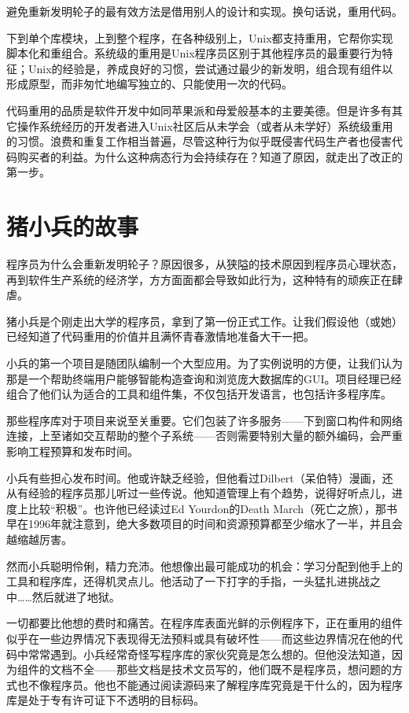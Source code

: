 \documentclass[12pt,oneside]{book}
\begin{document}
避免重新发明轮子的最有效方法是借用别人的设计和实现。换句话说，重用代码。

下到单个库模块，上到整个程序，在各种级别上，Unix都支持重用，它帮你实现脚本化和重组合。系统级的重用是Unix程序员区别于其他程序员的最重要行为特征；Unix的经验是，养成良好的习惯，尝试通过最少的新发明，组合现有组件以形成原型，而非匆忙地编写独立的、只能使用一次的代码。

代码重用的品质是软件开发中如同苹果派和母爱般基本的主要美德。但是许多有其它操作系统经历的开发者进入Unix社区后从未学会（或者从未学好）系统级重用的习惯。浪费和重复工作相当普遍，尽管这种行为似乎既侵害代码生产者也侵害代码购买者的利益。为什么这种病态行为会持续存在？知道了原因，就走出了改正的第一步。

\section{猪小兵的故事}
程序员为什么会重新发明轮子？原因很多，从狭隘的技术原因到程序员心理状态，再到软件生产系统的经济学，方方面面都会导致如此行为，这种特有的顽疾正在肆虐。

猪小兵是个刚走出大学的程序员，拿到了第一份正式工作。让我们假设他（或她）已经知道了代码重用的价值并且满怀青春激情地准备大干一把。

小兵的第一个项目是随团队编制一个大型应用。为了实例说明的方便，让我们认为那是一个帮助终端用户能够智能构造查询和浏览庞大数据库的GUI。项目经理已经组合了他们认为适合的工具和组件集，不仅包括开发语言，也包括许多程序库。

那些程序库对于项目来说至关重要。它们包装了许多服务——下到窗口构件和网络连接，上至诸如交互帮助的整个子系统——否则需要特别大量的额外编码，会严重影响工程预算和发布时间。

小兵有些担心发布时间。他或许缺乏经验，但他看过Dilbert（呆伯特）漫画，还从有经验的程序员那儿听过一些传说。他知道管理上有个趋势，说得好听点儿，进度上比较“积极”。也许他已经读过Ed Yourdon的Death March（死亡之旅）\cite{Yourdon}，那书早在1996年就注意到，绝大多数项目的时间和资源预算都至少缩水了一半，并且会越缩越厉害。

然而小兵聪明伶俐，精力充沛。他想像出最可能成功的机会：学习分配到他手上的工具和程序库，还得机灵点儿。他活动了一下打字的手指，一头猛扎进挑战之中……然后就进了地狱。

一切都要比他想的费时和痛苦。在程序库表面光鲜的示例程序下，正在重用的组件似乎在一些边界情况下表现得无法预料或具有破坏性——而这些边界情况在他的代码中常常遇到。小兵经常奇怪写程序库的家伙究竟是怎么想的。但他没法知道，因为组件的文档不全——那些文档是技术文员写的，他们既不是程序员，想问题的方式也不像程序员。他也不能通过阅读源码来了解程序库究竟是干什么的，因为程序库是处于专有许可证下不透明的目标码。
\end{document}
